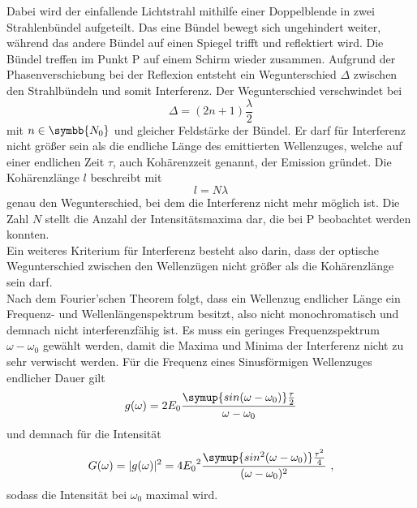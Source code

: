     Dabei wird der einfallende Lichtstrahl mithilfe einer Doppelblende in zwei Strahlenbündel aufgeteilt.
    Das eine Bündel bewegt sich ungehindert weiter,
    während das andere Bündel auf einen Spiegel trifft und reflektiert wird.
    Die Bündel treffen im Punkt P auf einem Schirm wieder zusammen.
    Aufgrund der Phasenverschiebung bei der Reflexion entsteht ein Wegunterschied $\Delta$ zwischen den Strahlbündeln
    und somit Interferenz.
    Der Wegunterschied verschwindet bei 
    \begin{equation*}
        \Delta = (2n+1) \frac{\lambda}{2}
    \end{equation*}
    mit $n \in \symbb{N_0}$ und gleicher Feldstärke der Bündel.
    Er darf für Interferenz nicht größer sein als die endliche Länge des emittierten Wellenzuges,
    welche auf einer endlichen Zeit $\tau$,
    auch Kohärenzzeit genannt,
    der Emission gründet.
    Die Kohärenzlänge $l$ beschreibt mit 
    \begin{equation}
        l = N \lambda
    \end{equation}
    genau den Wegunterschied, 
    bei dem die Interferenz nicht mehr möglich ist.
    Die Zahl $N$ stellt die Anzahl der Intensitätsmaxima dar,
    die bei P beobachtet werden konnten.\\
    Ein weiteres Kriterium für Interferenz besteht also darin,
    dass der optische Wegunterschied zwischen den Wellenzügen nicht größer als die Kohärenzlänge sein darf.\\
    Nach dem Fourier'schen Theorem folgt,
    dass ein Wellenzug endlicher Länge ein Frequenz- und Wellenlängenspektrum besitzt,
    also nicht monochromatisch und demnach nicht interferenzfähig ist.
    Es muss ein geringes Frequenzspektrum $\omega - \omega_0$ gewählt werden,
    damit die Maxima und Minima der Interferenz nicht zu sehr verwischt werden.
    Für die Frequenz eines Sinusförmigen Wellenzuges endlicher Dauer gilt 
    \begin{equation*}
        g(\omega) = 2 E_0 \frac{\symup{sin(\omega - \omega_0)} \frac{\tau}{2}}{\omega - \omega_0}
    \end{equation*}
    und demnach für die Intensität
    \begin{equation*}
        G(\omega) = \lvert g(\omega) \rvert ^2 = 4 {E_0}^2 \frac{\symup{sin^2(\omega - \omega_0)} \frac{{\tau}^2}{4}}{(\omega - \omega_0)^2} \ ,
    \end{equation*}
    sodass die Intensität bei $\omega_0$ maximal wird.


